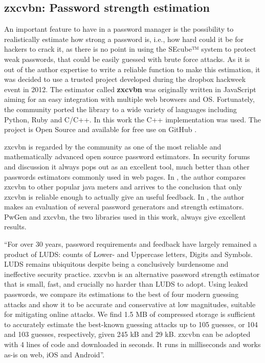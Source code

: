 \subsection{zxcvbn: Password strength estimation} \label{sec:zxcvbnth}

An important feature to have in a password manager is the possibility to realistically estimate how strong a password is, i.e., how hard could it be for hackers to crack it, as there is no point in using the SEcube™ system to protect weak passwords, that could be easily guessed with brute force attacks. As it is out of the author expertise to write a reliable function to make this estimation, it was decided to use a trusted project developed during the dropbox hackweek event in 2012. The estimator called \textbf{zxcvbn} was originally written in JavaScript aiming for an easy integration with multiple web browsers and OS. Fortunately, the community ported the library to a wide variety of languages including Python, Ruby and C/C++. In this work the C++ implementation was used. The project is Open Source and available for free use on GitHub \cite{zxgit}.

zxcvbn is regarded by the community as one of the most reliable and mathematically advanced open source password estimators. In security forums and discussion it always pops out as an excellent tool, much better than other passwords estimators commonly used in web pages. In \cite{naked}, the author compares zxcvbn to other popular java meters and arrives to the conclusion that only zxcvbn is reliable enough to actually give an useful feedback.
In \cite{gen_est_eval}, the author makes an evaluation of several password generators and strength estimators. PwGen and zxcvbn, the two libraries used in this work, always give excellent results.

``For over 30 years, password requirements and feedback have largely remained a product of LUDS: counts of Lower- and Uppercase letters, Digits and Symbols. LUDS remains ubiquitous despite being a conclusively burdensome and ineffective security practice. zxcvbn is an alternative password strength estimator that is small, fast, and crucially no harder than LUDS to adopt. Using leaked passwords, we compare its estimations to the best of four modern guessing attacks and show it to be accurate and conservative at low magnitudes, suitable for mitigating online attacks. We find 1.5 MB of compressed storage is sufficient to accurately estimate the best-known guessing attacks up to 105 guesses, or 104 and 103 guesses, respectively, given 245 kB and 29 kB. zxcvbn can be adopted with 4 lines of code and downloaded in seconds. It runs in milliseconds and works as-is on web, iOS and Android''. \cite{zxpaper}

